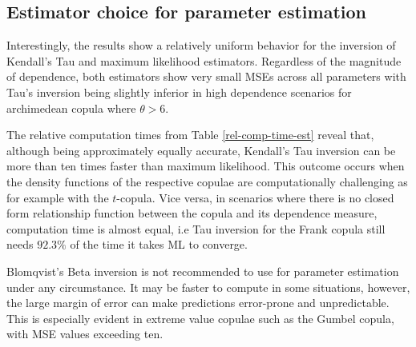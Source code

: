 \subsection{Estimator choice for parameter estimation}

Interestingly, the results show a relatively uniform behavior for the inversion of Kendall's Tau and maximum likelihood estimators. Regardless of the magnitude of dependence, both estimators show very small MSEs across all parameters with Tau's inversion being slightly inferior in high dependence scenarios for archimedean copula where $\theta > 6$. 

The relative computation times from Table \ref{rel-comp-time-est} reveal that, although being approximately equally accurate, Kendall's Tau inversion can be more than ten times faster than maximum likelihood. This outcome occurs when the density functions of the respective copulae are computationally challenging as for example with the $t$-copula. Vice versa, in scenarios where there is no closed form relationship function between the copula and its dependence measure, computation time is almost equal, i.e Tau inversion for the Frank copula still needs $92.3\%$ of the time it takes ML to converge.

Blomqvist's Beta inversion is not recommended to use for parameter estimation under any circumstance. It may be faster to compute in some situations, however, the large margin of error can make predictions error-prone and unpredictable. This is especially evident in extreme value copulae such as the Gumbel copula, with MSE values exceeding ten.

